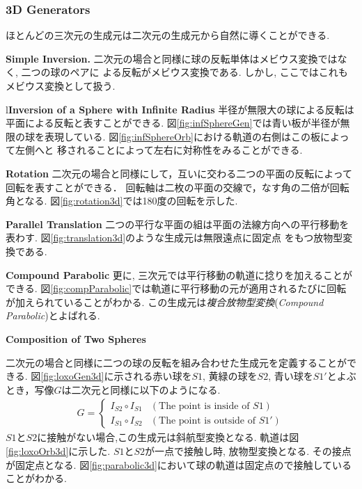 \subsubsection{3D Generators}
ほとんどの三次元の生成元は二次元の生成元から自然に導くことができる.

\noindent\textbf{Simple Inversion.}
二次元の場合と同様に球の反転単体はメビウス変換ではなく, 二つの球のペアに
よる反転がメビウス変換である.
しかし, ここではこれもメビウス変換として扱う.

l\noindent\textbf{Inversion of a Sphere with Infinite Radius}
半径が無限大の球による反転は平面による反転と表すことができる.
図\ref{fig:infSphereGen}では青い板が半径が無限の球を表現している.
図\ref{fig:infSphereOrb}における軌道の右側はこの板によって左側へと
移されることによって左右に対称性をみることができる.

\noindent\textbf{Rotation}
二次元の場合と同様にして，互いに交わる二つの平面の反転によって
回転を表すことができる．
回転軸は二枚の平面の交線で，なす角の二倍が回転角となる.
図\ref{fig:rotation3d}では180度の回転を示した.

\noindent\textbf{Parallel Translation}
二つの平行な平面の組は平面の法線方向への平行移動を表わす.
図\ref{fig:translation3d}のような生成元は無限遠点に固定点
をもつ放物型変換である.

\noindent\textbf{Compound Parabolic}
更に, 三次元では平行移動の軌道に捻りを加えることができる.
図\ref{fig:compParabolic}では軌道に平行移動の元が適用されるたびに回転
が加えられていることがわかる.
この生成元は\emph{複合放物型変換}(\textit{Compound Parabolic})とよばれる.

\noindent\textbf{Composition of Two Spheres}

二次元の場合と同様に二つの球の反転を組み合わせた生成元を定義することができる.
図\ref{fig:loxoGen3d}に示される赤い球を$S1$, 黄緑の球を$S2$,
青い球を$S1'$とよぶとき，写像$G$は二次元と同様に以下のようになる.
\begin{align*}
G =
\begin{cases}
 I_{S2} \circ I_{S1} & (\text{The point is inside of } S1) \\
 I_{S1} \circ I_{S2} & (\text{The point is outside of }S1')
\end{cases}
\end{align*}
$S1$と$S2$に接触がない場合,この生成元は斜航型変換となる.
軌道は図\ref{fig:loxoOrb3d}に示した.
$S1$と$S2$が一点で接触し時, 放物型変換となる.
その接点が固定点となる.
図\ref{fig:parabolic3d}において球の軌道は固定点ので接触していることがわかる.

